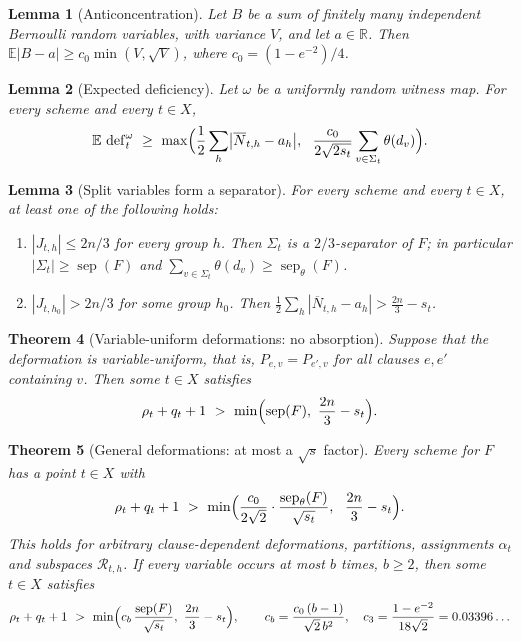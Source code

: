 \documentclass[11pt,a4paper]{article}
\newtheorem{theorem}{Theorem}[section]
\newtheorem{lemma}[theorem]{Lemma}
\theoremstyle{definition}
\theoremstyle{remark}
\newcommand{\E}{\mathbb{E}}
\newcommand{\cR}{\mathcal{R}}
\newcommand{\sep}{\operatorname{sep}}
\newcommand{\sepw}{\operatorname{sep}_{\theta}}
\newcommand{\dfc}{\operatorname{def}}
\newcommand{\Nbar}{\overline{N}}
\begin{document}
\begin{lemma}[Anticoncentration]\label{lem:anti}
Let $B$ be a sum of finitely many independent Bernoulli random variables, with variance $V$,
and let $a\in\mathbb R$. Then $\E|B-a|\ge c_0\min(V,\sqrt V)$, where $c_0=(1-e^{-2})/4$.
\end{lemma}

\begin{lemma}[Expected deficiency]\label{lem:expdef}
Let $\omega$ be a uniformly random witness map. For every scheme and every $t\in X$,
\[
\E\,\dfc^\omega_t\ \ge\ \max\Bigl(\frac12\sum_h\bigl|\Nbar_{t,h}-a_h\bigr|,\ \
\frac{c_0}{2\sqrt{2s_t}}\sum_{v\in\Sigma_t}\theta(d_v)\Bigr).
\]
\end{lemma}

\begin{lemma}[Split variables form a separator]\label{lem:split}
For every scheme and every $t\in X$, at least one of the following holds:
\begin{enumerate}
\item[\textup{(1)}] $|J_{t,h}|\le 2n/3$ for every group $h$. Then $\Sigma_t$ is a
 $2/3$-separator of $F$; in particular $|\Sigma_t|\ge\sep(F)$ and
 $\sum_{v\in\Sigma_t}\theta(d_v)\ge\sepw(F)$.
\item[\textup{(2)}] $|J_{t,h_0}|>2n/3$ for some group $h_0$. Then
 $\frac12\sum_h|\Nbar_{t,h}-a_h|>\frac{2n}{3}-s_t$.
\end{enumerate}
\end{lemma}

\begin{theorem}[Variable-uniform deformations: no absorption]\label{thm:uniform}
Suppose that the deformation is variable-uniform, that is, $P_{e,v}=P_{e',v}$ for all clauses
$e,e'$ containing $v$. Then some $t\in X$ satisfies
\[
\rho_t+q_t+1\ >\ \min\Bigl(\sep(F),\ \frac{2n}{3}-s_t\Bigr).
\]
\end{theorem}

\begin{theorem}[General deformations: at most a $\sqrt s$ factor]\label{thm:general}
Every scheme for $F$ has a point $t\in X$ with
\[
\rho_t+q_t+1\ >\ \min\Bigl(\frac{c_0}{2\sqrt2}\cdot\frac{\sepw(F)}{\sqrt{s_t}},\ \
\frac{2n}{3}-s_t\Bigr).
\]
This holds for arbitrary clause-dependent deformations, partitions, assignments $\alpha_t$
and subspaces $\cR_{t,h}$. If every variable occurs at most $b$ times, $b\ge2$, then some
$t\in X$ satisfies
\[
\rho_t+q_t+1\ >\ \min\Bigl(c_b\,\frac{\sep(F)}{\sqrt{s_t}},\ \frac{2n}{3}-s_t\Bigr),
\qquad c_b=\frac{c_0\,(b-1)}{\sqrt2\,b^2},\quad c_3=\frac{1-e^{-2}}{18\sqrt2}=0.03396\ldots
\]
\end{theorem}
\end{document}
